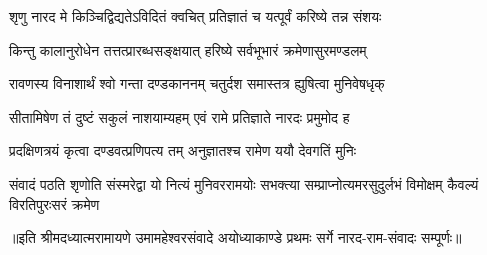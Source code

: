 \twolineshloka
{शृणु नारद मे किञ्चिद्विद्यतेऽविदितं क्वचित्}
{प्रतिज्ञातं च यत्पूर्वं करिष्ये तन्न संशयः} %

\twolineshloka
{किन्तु कालानुरोधेन तत्तत्प्रारब्धसङ्क्षयात्}
{हरिष्ये सर्वभूभारं क्रमेणासुरमण्डलम्} %

\twolineshloka
{रावणस्य विनाशार्थं श्वो गन्ता दण्डकाननम्}
{चतुर्दश समास्तत्र ह्युषित्वा मुनिवेषधृक्} %

\twolineshloka
{सीतामिषेण तं दुष्टं सकुलं नाशयाम्यहम्}
{एवं रामे प्रतिज्ञाते नारदः प्रमुमोद ह} %

\twolineshloka
{प्रदक्षिणत्रयं कृत्वा दण्डवत्प्रणिपत्य तम्}
{अनुज्ञातश्च रामेण ययौ देवगतिं मुनिः} %

\fourlineindentedshloka
{संवादं पठति शृणोति संस्मरेद्वा}
{यो नित्यं मुनिवररामयोः सभक्त्या}
{सम्प्राप्नोत्यमरसुदुर्लभं विमोक्षम्}
{कैवल्यं विरतिपुरःसरं क्रमेण} %

{॥इति श्रीमदध्यात्मरामायणे उमामहेश्वरसंवादे
अयोध्याकाण्डे प्रथमः सर्गे  नारद-राम-संवादः  सम्पूर्णः॥}
